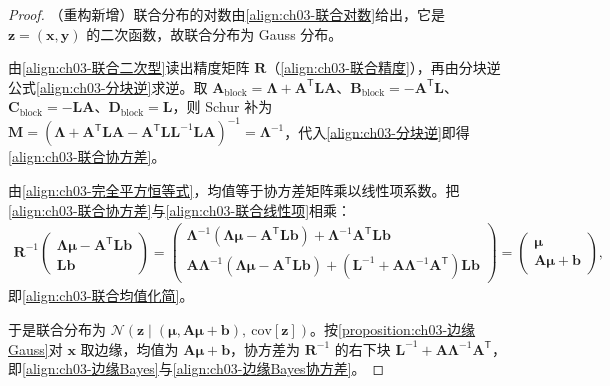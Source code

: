 \documentclass[../../main.tex]{subfiles}
\begin{document}
\begin{proof}
（重构新增）联合分布的对数由\eqref{align:ch03-联合对数}给出，它是 $\boldsymbol{z}=(\boldsymbol{x},\boldsymbol{y})$ 的二次函数，故联合分布为 Gauss 分布。

由\eqref{align:ch03-联合二次型}读出精度矩阵 $\boldsymbol{R}$（\eqref{align:ch03-联合精度}），再由分块逆公式\eqref{align:ch03-分块逆}求逆。取 $\boldsymbol{A}_{\text{block}}=\boldsymbol{\Lambda}+\boldsymbol{A}^{\mathsf{T}}\boldsymbol{L}\boldsymbol{A}$、$\boldsymbol{B}_{\text{block}}=-\boldsymbol{A}^{\mathsf{T}}\boldsymbol{L}$、$\boldsymbol{C}_{\text{block}}=-\boldsymbol{L}\boldsymbol{A}$、$\boldsymbol{D}_{\text{block}}=\boldsymbol{L}$，则 Schur 补为 $\boldsymbol{M}=(\boldsymbol{\Lambda}+\boldsymbol{A}^{\mathsf{T}}\boldsymbol{L}\boldsymbol{A}-\boldsymbol{A}^{\mathsf{T}}\boldsymbol{L}\boldsymbol{L}^{-1}\boldsymbol{L}\boldsymbol{A})^{-1}=\boldsymbol{\Lambda}^{-1}$，代入\eqref{align:ch03-分块逆}即得\eqref{align:ch03-联合协方差}。

由\eqref{align:ch03-完全平方恒等式}，均值等于协方差矩阵乘以线性项系数。把\eqref{align:ch03-联合协方差}与\eqref{align:ch03-联合线性项}相乘：
\begin{align*}
\boldsymbol{R}^{-1}\begin{pmatrix}\boldsymbol{\Lambda}\boldsymbol{\mu}-\boldsymbol{A}^{\mathsf{T}}\boldsymbol{L}\boldsymbol{b}\\ \boldsymbol{L}\boldsymbol{b}\end{pmatrix}=\begin{pmatrix}\boldsymbol{\Lambda}^{-1}(\boldsymbol{\Lambda}\boldsymbol{\mu}-\boldsymbol{A}^{\mathsf{T}}\boldsymbol{L}\boldsymbol{b})+\boldsymbol{\Lambda}^{-1}\boldsymbol{A}^{\mathsf{T}}\boldsymbol{L}\boldsymbol{b}\\ \boldsymbol{A}\boldsymbol{\Lambda}^{-1}(\boldsymbol{\Lambda}\boldsymbol{\mu}-\boldsymbol{A}^{\mathsf{T}}\boldsymbol{L}\boldsymbol{b})+(\boldsymbol{L}^{-1}+\boldsymbol{A}\boldsymbol{\Lambda}^{-1}\boldsymbol{A}^{\mathsf{T}})\boldsymbol{L}\boldsymbol{b}\end{pmatrix}=\begin{pmatrix}\boldsymbol{\mu}\\ \boldsymbol{A}\boldsymbol{\mu}+\boldsymbol{b}\end{pmatrix},
\end{align*}
即\eqref{align:ch03-联合均值化简}。

于是联合分布为 $\mathcal{N}(\boldsymbol{z}\mid(\boldsymbol{\mu},\boldsymbol{A}\boldsymbol{\mu}+\boldsymbol{b}),\ \mathrm{cov}[\boldsymbol{z}])$。按\cref{proposition:ch03-边缘Gauss}对 $\boldsymbol{x}$ 取边缘，均值为 $\boldsymbol{A}\boldsymbol{\mu}+\boldsymbol{b}$，协方差为 $\boldsymbol{R}^{-1}$ 的右下块 $\boldsymbol{L}^{-1}+\boldsymbol{A}\boldsymbol{\Lambda}^{-1}\boldsymbol{A}^{\mathsf{T}}$，即\eqref{align:ch03-边缘Bayes}与\eqref{align:ch03-边缘Bayes协方差}。


\end{proof}
\end{document}
